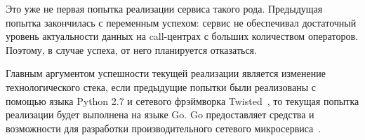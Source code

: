Это уже не первая попытка реализации сервиса такого рода.
Предыдущая попытка закончилась с переменным успехом: сервис не обеспечивал достаточный уровень актуальности данных
на call-центрах с больших количеством операторов.
Поэтому, в случае успеха, от него планируется отказаться.

Главным аргументом успешности текущей реализации является изменение технологического стека,
если предыдущие попытки были реализованы с помощью языка Python 2.7 и сетевого фрэймворка Twisted~\cite{info:twisted}, %
то текущая попытка реализации будет выполнена на языке Go.
Go предоставляет средства и возможности для разработки производительного сетевого микросервиса~\cite{youtube:go}.




